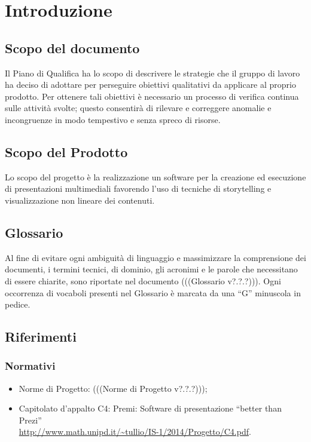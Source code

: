 \section{Introduzione}
\subsection{Scopo del documento}
Il Piano di Qualifica ha lo scopo di descrivere le strategie che il gruppo di lavoro ha deciso di adottare per perseguire obiettivi qualitativi da applicare al proprio prodotto. Per ottenere tali obiettivi è necessario un processo di verifica continua sulle attività svolte; questo consentirà di rilevare e correggere anomalie e incongruenze in modo tempestivo e senza spreco di risorse.
\subsection{Scopo del Prodotto}
Lo scopo del progetto è la realizzazione un software per la creazione ed esecuzione di presentazioni multimediali favorendo l’uso di tecniche di storytelling e visualizzazione non lineare dei contenuti.
\subsection{Glossario}
Al fine di evitare ogni ambiguità di linguaggio e massimizzare la comprensione dei documenti, i termini tecnici, di dominio, gli acronimi e le parole che necessitano di essere chiarite, sono riportate nel documento (((Glossario v?.?.?))). Ogni occorrenza di vocaboli presenti nel Glossario è marcata da una “G” minuscola in pedice.
\subsection{Riferimenti}

\subsubsection{Normativi}
\begin{itemize}


\item Norme di Progetto: (((Norme di Progetto v?.?.?)));
\item Capitolato d’appalto C4: Premi: Software di presentazione “better than Prezi” \\
\url{http://www.math.unipd.it/~tullio/IS-1/2014/Progetto/C4.pdf}.
\end{itemize}

